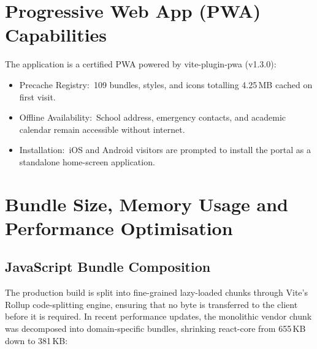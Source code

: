 \documentclass[12pt, a4paper, oneside]{report}
\def\textbf#1{#1}
\def\texttt#1{#1}
\def\&{and}
\begin{document}
\section{Progressive Web App (PWA) Capabilities}

The application is a certified PWA powered by \texttt{vite-plugin-pwa (v1.3.0)}:
\begin{itemize}
  \item \textbf{Precache Registry:}\ 109 bundles, styles, and icons totalling
        4.25\,MB cached on first visit.
  \item \textbf{Offline Availability:}\ School address, emergency contacts, and
        academic calendar remain accessible without internet.
  \item \textbf{Installation:}\ iOS and Android visitors are prompted to install
        the portal as a standalone home-screen application.
\end{itemize}

\section{Bundle Size, Memory Usage \& Performance Optimisation}

\subsection{JavaScript Bundle Composition}

The production build is split into fine-grained lazy-loaded chunks through Vite's
Rollup code-splitting engine, ensuring that no byte is transferred to the client
before it is required. In recent performance updates, the monolithic vendor chunk
was decomposed into domain-specific bundles, shrinking \texttt{react-core} from
655\,KB down to 381\,KB:
\end{document}
